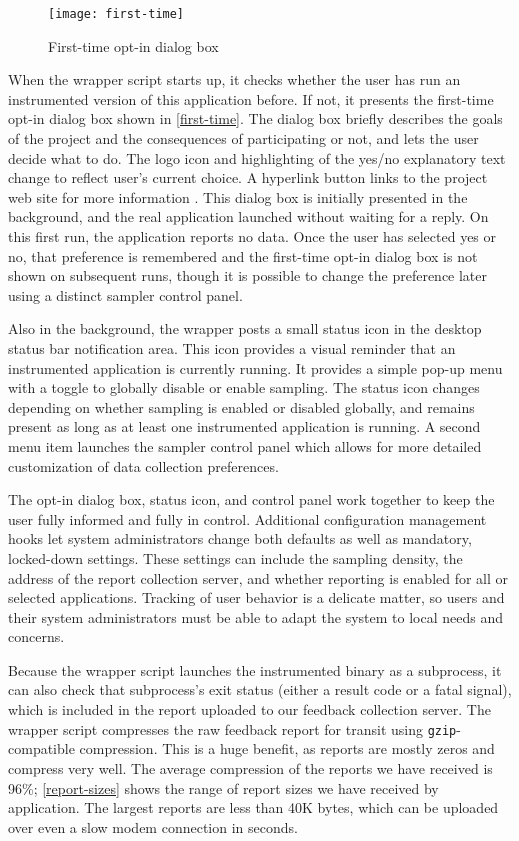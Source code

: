 \documentclass[10pt,twocolumn]{article}
\begin{document}
\begin{figure}
  \centering
  \texttt{[image: first-time]}
  \caption{First-time opt-in dialog box}
  \label{first-time}
\end{figure}

When the wrapper script starts up, it checks whether the user has run
an instrumented version of this application before.  If not, it
presents the first-time opt-in dialog box shown in
\autoref{first-time}. The dialog box briefly describes the goals of
the project and the consequences of participating or not, and lets the
user decide what to do.  The logo icon and highlighting of the yes/no
explanatory text change to reflect user's current choice.  A hyperlink
button links to the project web site for more information
\cite{Liblit:CBIP}.  This dialog box is initially presented in the
background, and the real application launched without waiting for a
reply.  On this first run, the application reports no data. Once the
user has selected yes or no, that preference is remembered and the
first-time opt-in dialog box is not shown on subsequent runs, though
it is possible to change the preference later using a distinct sampler
control panel.

Also in the background, the wrapper posts a small status icon in
the desktop status bar notification area.  This icon provides a
visual reminder that an instrumented application is currently
running. It provides a simple pop-up menu with a toggle to globally
disable or enable sampling.  The status icon changes depending on
whether sampling is enabled or disabled globally, and remains present
as long as at least one instrumented application is running.  A second
menu item launches the sampler control panel which allows for
more detailed customization of data collection preferences.

The opt-in dialog box, status icon, and control panel work together to
keep the user fully informed and fully in control.  Additional
configuration management hooks let system administrators change both
defaults as well as mandatory, locked-down settings.  These settings
can include the sampling density, the address of the report collection
server, and whether reporting is enabled for all or selected
applications.  Tracking of user behavior is a delicate matter, so
users and their system administrators must be able to adapt the system
to local needs and concerns.

Because the wrapper script launches the instrumented binary as a
subprocess, it can also check that subprocess's exit status (either a
result code or a fatal signal), which is included in the report
uploaded to our feedback collection server.
The wrapper script compresses the raw feedback report for transit
using \texttt{gzip}-compatible compression.  This is a huge benefit, as reports
are mostly zeros and compress very well.  The average compression
of the reports we have received is 96\%; \autoref{report-sizes} shows
the range of report sizes we have received by application.  
The largest reports are less than 40K bytes, which can be uploaded
over even a slow modem connection in seconds.
\end{document}
